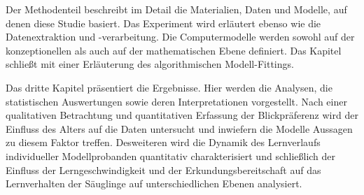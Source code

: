 \documentclass[a4paper]{article}
\begin{document}
Der Methodenteil beschreibt im Detail die Materialien, Daten und Modelle, auf denen diese Studie basiert. Das Experiment wird erl\"autert ebenso wie die Datenextraktion und -verarbeitung. Die Computermodelle werden sowohl auf der konzeptionellen als auch auf der mathematischen Ebene definiert. Das Kapitel schlie\ss t mit einer Erl\"auterung des algorithmischen Modell-Fittings.

Das dritte Kapitel pr\"asentiert die Ergebnisse. Hier werden die Analysen, die statistischen Auswertungen sowie deren Interpretationen vorgestellt. Nach einer qualitativen Betrachtung und quantitativen Erfassung der Blickpr\"aferenz wird der Einfluss des Alters auf die Daten untersucht und inwiefern die Modelle Aussagen zu diesem Faktor treffen. Desweiteren wird die Dynamik des Lernverlaufs individueller Modellprobanden quantitativ charakterisiert und schlie\ss lich der Einfluss der Lerngeschwindigkeit und der Erkundungsbereitschaft auf das Lernverhalten der S\"auglinge auf unterschiedlichen Ebenen analysiert.
\end{document}
